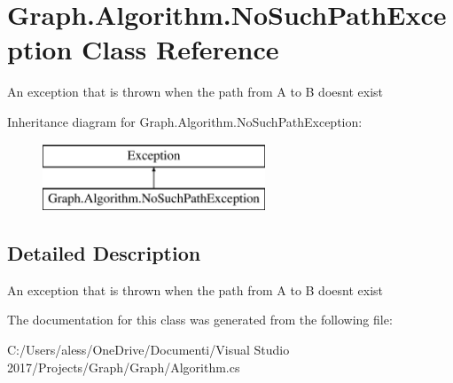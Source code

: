 \hypertarget{class_graph_1_1_algorithm_1_1_no_such_path_exception}{}\section{Graph.\+Algorithm.\+No\+Such\+Path\+Exception Class Reference}
\label{class_graph_1_1_algorithm_1_1_no_such_path_exception}


An exception that is thrown when the path from A to B doesn\textquotesingle{}t exist  


Inheritance diagram for Graph.\+Algorithm.\+No\+Such\+Path\+Exception\+:\begin{figure}[H]
\begin{center}
\leavevmode
\includegraphics[height=2.000000cm]{class_graph_1_1_algorithm_1_1_no_such_path_exception}
\end{center}
\end{figure}


\subsection{Detailed Description}
An exception that is thrown when the path from A to B doesn\textquotesingle{}t exist 



The documentation for this class was generated from the following file\+:\begin{DoxyCompactItemize}
\item 
C\+:/\+Users/aless/\+One\+Drive/\+Documenti/\+Visual Studio 2017/\+Projects/\+Graph/\+Graph/Algorithm.\+cs\end{DoxyCompactItemize}
